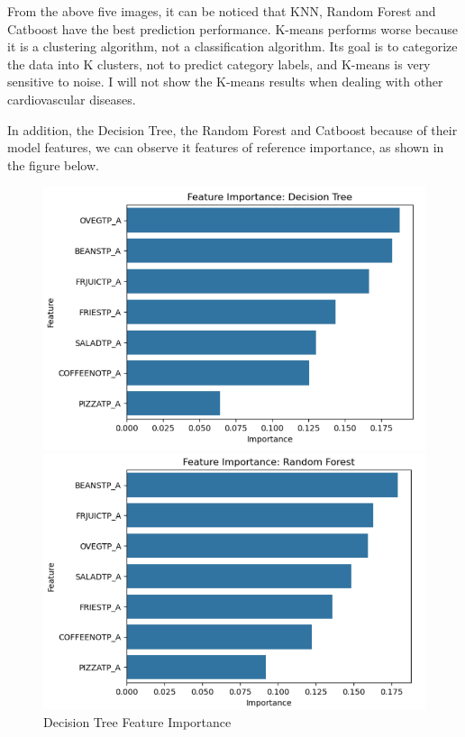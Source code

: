 \documentclass{article}
\begin{document}
From the above five images, it can be noticed that KNN, Random Forest and Catboost have the best prediction performance. K-means performs worse because it is a clustering algorithm, not a classification algorithm. Its goal is to categorize the data into K clusters, not to predict category labels, and K-means is very sensitive to noise. I will not show the K-means results when dealing with other cardiovascular diseases.

In addition, the Decision Tree, the Random Forest and Catboost because of their model features, we can observe it features of reference importance, as shown in the figure below.

\begin{figure}[h!]
	\centering
	\begin{minipage}{0.32\textwidth}
		\centering
		\includegraphics[width=0.9\linewidth]{../Image/P13.jpg}
		\caption{Decision Tree Feature Importance}
		\label{fig:P13}
	\end{minipage}\hfill
	\begin{minipage}{0.32\textwidth}
		\centering
		\includegraphics[width=0.9\linewidth]{../Image/P14.jpg}

\end{minipage}
\end{figure}
\end{document}
